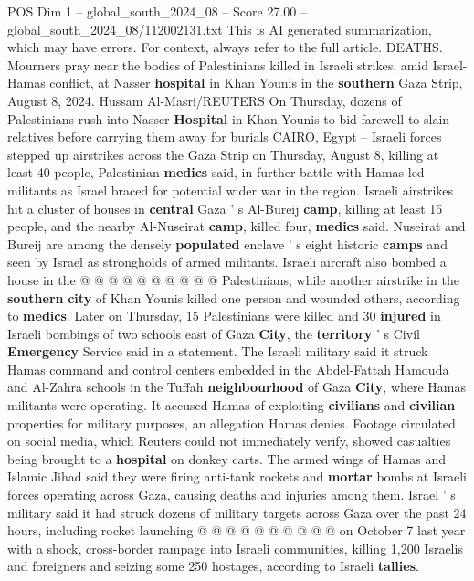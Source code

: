 \begin{textsample}{POS Dim 1 – global\_south\_2024\_08 – Score 27.00 – global\_south\_2024\_08/112002131.txt}  \label{ex:f1_pos_327}
This is AI generated summarization, which may have errors.
For context, always refer to the full article.
DEATHS.
Mourners pray near the bodies of Palestinians killed in Israeli strikes, amid Israel-Hamas conflict, at Nasser \textbf{hospital} in Khan Younis in the \textbf{southern} Gaza Strip, August 8, 2024.
Hussam Al-Masri/REUTERS On Thursday, dozens of Palestinians rush into Nasser \textbf{Hospital} in Khan Younis to bid farewell to slain relatives before carrying them away for burials CAIRO, Egypt -- Israeli forces stepped up airstrikes across the Gaza Strip on Thursday, August 8, killing at least 40 people, Palestinian \textbf{medics} said, in further battle with Hamas-led militants as Israel braced for potential wider war in the region.
Israeli airstrikes hit a cluster of houses in \textbf{central} Gaza ' s Al-Bureij \textbf{camp}, killing at least 15 people, and the nearby Al-Nuseirat \textbf{camp}, killed four, \textbf{medics} said.
Nuseirat and Bureij are among the densely \textbf{populated} enclave ' s eight historic \textbf{camps} and seen by Israel as strongholds of armed militants.
Israeli aircraft also bombed a house in the @ @ @ @ @ @ @ @ @ @ Palestinians, while another airstrike in the \textbf{southern} \textbf{city} of Khan Younis killed one person and wounded others, according to \textbf{medics}.
Later on Thursday, 15 Palestinians were killed and 30 \textbf{injured} in Israeli bombings of two schools east of Gaza \textbf{City}, the \textbf{territory} ' s Civil \textbf{Emergency} Service said in a statement.
The Israeli military said it struck Hamas command and control centers embedded in the Abdel-Fattah Hamouda and Al-Zahra schools in the Tuffah \textbf{neighbourhood} of Gaza \textbf{City}, where Hamas militants were operating.
It accused Hamas of exploiting \textbf{civilians} and \textbf{civilian} properties for military purposes, an allegation Hamas denies.
Footage circulated on social media, which Reuters could not immediately verify, showed casualties being brought to a \textbf{hospital} on donkey carts.
The armed wings of Hamas and Islamic Jihad said they were firing anti-tank rockets and \textbf{mortar} bombs at Israeli forces operating across Gaza, causing deaths and injuries among them.
Israel ' s military said it had struck dozens of military targets across Gaza over the past 24 hours, including rocket launching @ @ @ @ @ @ @ @ @ @ on October 7 last year with a shock, cross-border rampage into Israeli communities, killing 1,200 Israelis and foreigners and seizing some 250 hostages, according to Israeli \textbf{tallies}.

\end{textsample}
